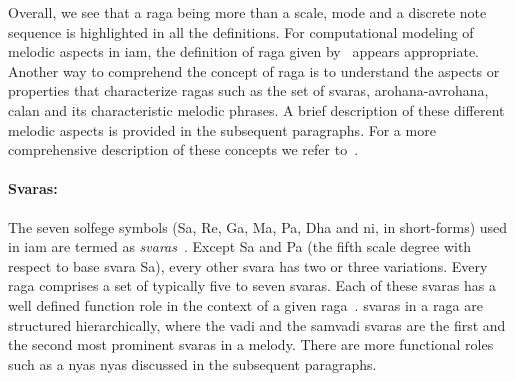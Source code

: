 Overall, we see that a \gls{raga} being more than a scale, mode and a discrete note sequence is highlighted in all the definitions. For computational modeling of melodic aspects in \gls{iam}, the definition of \gls{raga} given by~\cite{chordia2013joint} appears appropriate. Another way to comprehend the concept of \gls{raga} is to understand the aspects or properties that characterize \glspl{raga} such as the set of \glspl{svara}, \gls{arohana}-\gls{avrohana}, calan and its characteristic melodic phrases. A brief description of these different melodic aspects is provided in the subsequent paragraphs. For a more comprehensive description of these concepts we refer to~\citep{Danielou2010,Bagchee1998,Viswanathan2004}.


\paragraph{Svaras:} The seven solfege symbols (Sa, Re, Ga, Ma, Pa, Dha and \acrshort{ni}, in short-forms) used in \gls{iam} are termed as \textit{svaras}~\citep{Danielou2010,Bagchee1998}. Except Sa and Pa (the fifth scale degree with respect to base \gls{svara} Sa), every other \gls{svara} has two or three variations. Every \gls{raga} comprises a set of typically five to seven \glspl{svara}. Each of these \glspl{svara} has a well defined function role in the context of a given \gls{raga}~\citep{Viswanathan2004}. \Glspl{svara} in a \gls{raga} are structured hierarchically, where the \gls{vadi} and the \gls{samvadi} \glspl{svara} are the first and the second most prominent \glspl{svara} in a melody. There are more functional roles such as a \gls{nyas} \gls{nyas} discussed in the subsequent paragraphs. 

